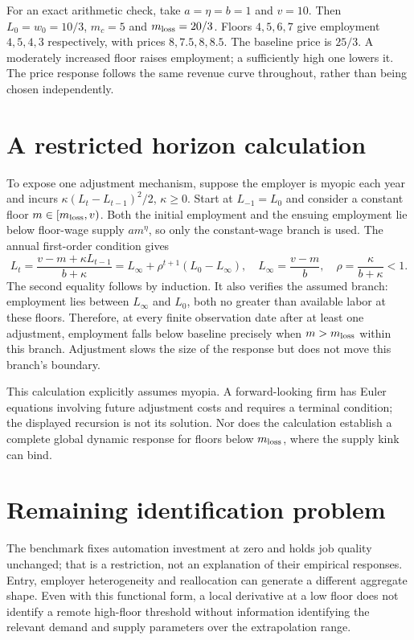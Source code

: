 \documentclass[11pt]{article}
\begin{document}
For an exact arithmetic check, take $a=\eta=b=1$ and $v=10$. Then $L_0=w_0=10/3$, $m_c=5$ and $m_{\rm loss}=20/3$. Floors $4,5,6,7$ give employment $4,5,4,3$ respectively, with prices $8,7.5,8,8.5$. The baseline price is $25/3$. A moderately increased floor raises employment; a sufficiently high one lowers it. The price response follows the same revenue curve throughout, rather than being chosen independently.

\section*{A restricted horizon calculation}
To expose one adjustment mechanism, suppose the employer is myopic each year and incurs $\kappa(L_t-L_{t-1})^2/2$, $\kappa\geq0$. Start at $L_{-1}=L_0$ and consider a constant floor $m\in[m_{\rm loss},v)$. Both the initial employment and the ensuing employment lie below floor-wage supply $a m^\eta$, so only the constant-wage branch is used. The annual first-order condition gives
\[
 L_t=\frac{v-m+\kappa L_{t-1}}{b+\kappa}
 =L_\infty+\rho^{t+1}(L_0-L_\infty),\quad
 L_\infty=\frac{v-m}{b},\quad \rho=\frac{\kappa}{b+\kappa}<1.
\]
The second equality follows by induction. It also verifies the assumed branch: employment lies between $L_\infty$ and $L_0$, both no greater than available labor at these floors. Therefore, at every finite observation date after at least one adjustment, employment falls below baseline precisely when $m>m_{\rm loss}$ within this branch. Adjustment slows the size of the response but does not move this branch's boundary.

This calculation explicitly assumes myopia. A forward-looking firm has Euler equations involving future adjustment costs and requires a terminal condition; the displayed recursion is not its solution. Nor does the calculation establish a complete global dynamic response for floors below $m_{\rm loss}$, where the supply kink can bind.

\section*{Remaining identification problem}
The benchmark fixes automation investment at zero and holds job quality unchanged; that is a restriction, not an explanation of their empirical responses. Entry, employer heterogeneity and reallocation can generate a different aggregate shape. Even with this functional form, a local derivative at a low floor does not identify a remote high-floor threshold without information identifying the relevant demand and supply parameters over the extrapolation range.
\end{document}
